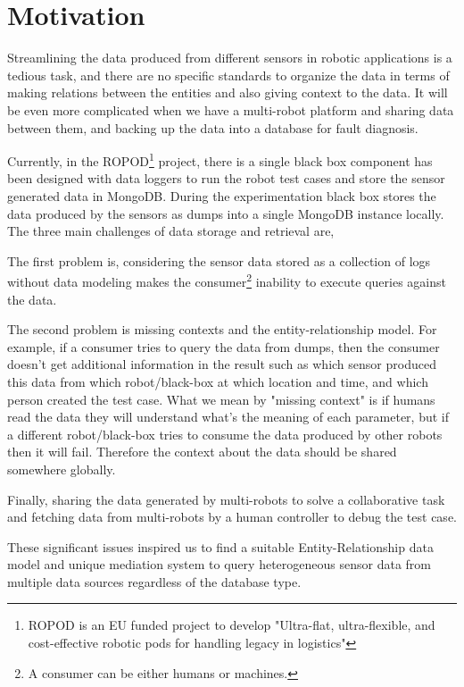     \section{Motivation}
    
		Streamlining the data produced from different sensors in robotic applications is a tedious task, and there are no specific standards to organize the data in terms of making relations between the entities and also giving context to the data. It will be even more complicated when we have a multi-robot platform and sharing data between them, and backing up the data into a database for fault diagnosis.
		
		Currently, in the ROPOD\footnote{ROPOD is an EU funded project to develop "Ultra-flat, ultra-flexible, and cost-effective robotic pods for handling legacy in logistics"} project, there is a single black box component has been designed with data loggers to run the robot test cases and store the sensor generated data in MongoDB. During the experimentation black box stores the data produced by the sensors as dumps into a single MongoDB instance locally. The three main challenges of data storage and retrieval are, 
		
		The first problem is, considering the sensor data stored as a collection of logs without data modeling makes the consumer\footnote{A consumer can be either humans or machines.} inability to execute queries against the data. 
		
		The second problem is missing contexts and the entity-relationship model. For example, if a consumer tries to query the data from dumps, then the consumer doesn't get additional information in the result such as which sensor produced this data from which robot/black-box at which location and time, and which person created the test case. What we mean by "missing context" is if humans read the data they will understand what's the meaning of each parameter, but if a different robot/black-box tries to consume the data produced by other robots then it will fail. Therefore the context about the data should be shared somewhere globally.
		
		Finally, sharing the data generated by multi-robots to solve a collaborative task and fetching data from multi-robots by a human controller to debug the test case.
		
		These significant issues inspired us to find a suitable Entity-Relationship data model and unique mediation system to query heterogeneous sensor data from multiple data sources regardless of the database type.



